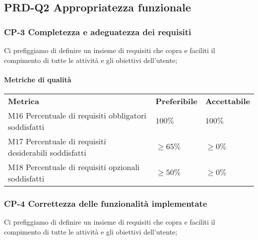     \subsection{PRD-Q2 Appropriatezza funzionale}
        \subsubsection{CP-3 Completezza e adeguatezza dei requisiti}
        	Ci prefiggiamo di definire un insieme di requisiti che copra e faciliti il compimento di tutte le attività e gli obiettivi dell'utente;
        \paragraph{Metriche di qualità}
        \begin{longtable} {
        		>{}p{80mm} 
        		>{}p{25mm}
        		>{}p{25mm}
        	}
        	\rowcolor{gray!50}
        	\textbf{Metrica} & \textbf{Preferibile} & \textbf{Accettabile} \TBstrut \TBstrut \\
        	M16 Percentuale di requisiti obbligatori soddisfatti & $100\%$ & $100\%$ \TBstrut \\ [2mm]
        	M17 Percentuale di requisiti desiderabili soddisfatti & $\ge65\%$ & $\ge0\%$ \TBstrut \\ [2mm]
        	M18 Percentuale di requisiti opzionali soddisfatti & $\ge50\%$ & $\ge0\%$ \TBstrut \\ [2mm]
        \end{longtable}
    \subsubsection{CP-4 Correttezza delle funzionalità implementate}
    	Ci prefiggiamo di definire un insieme di requisiti che copra e faciliti il compimento di tutte le attività e gli obiettivi dell'utente;
